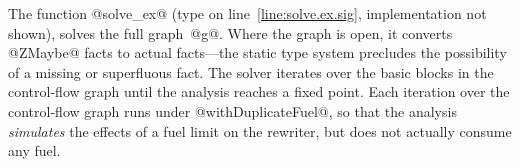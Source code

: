 \documentclass[blockstyle,preprint,natbib,nocopyrightspace]{sigplanconf}
\newenvironment{smallcode}{\par\unskip\small\verbatim}{\endverbatim}
\newcommand\lineref[1]{line~\ref{line:#1}}
\def\authornote#1{\unskip\relax}
\newcommand{\john}[1]{\authornote{JD: #1}}
\newcommand\delendum[1]{\relax\ifvmode\else\unskip\fi\relax}
\newcommand\figref[1]{Figure~\ref{fig:#1}}
\begin{document}
%
\delendum{Hang on!  What kind of graph does {\tt zdfSolveFwd} take?
I assume a full graph, closed at the entry!  So what is this pesky {\tt in\_fact}??}
%



The function @solve_ex@ (type on \lineref{solve.ex.sig}, implementation not
shown), solves the full graph~@g@.
Where the graph is open, it converts @ZMaybe@ facts to actual
facts---the static type system precludes the possibility of a missing
or superfluous fact.
The solver iterates
over the basic blocks in the control-flow graph until the analysis reaches a fixed point.
Each iteration over the control-flow graph runs under @withDuplicateFuel@, so that the analysis
\emph{simulates} the effects of a fuel limit on the rewriter, but does
not actually consume any fuel.
\end{document}
